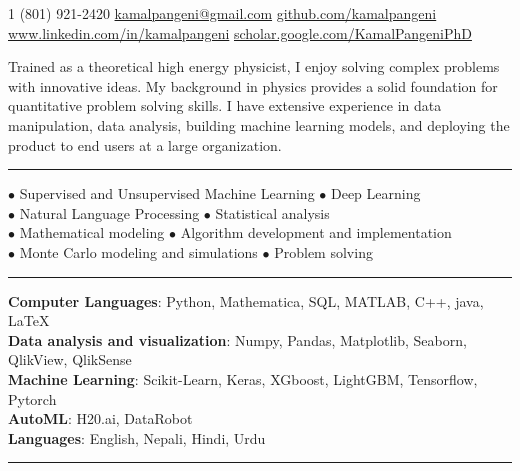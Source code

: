 \documentclass[10pt,letterpaper]{article}
\begin{document}

\noindent\textsmaller{+}1 (801) 921-2420\bull
\href{mailto:kamalpangeni@gmail.com}{kamalpangeni@gmail.com}\bull
\href{https://github.com/kamalpangeni}
{github.com/kamalpangeni}\\
\href{https://www.linkedin.com/in/kamal-pangeni-31242a29/}
{www.linkedin.com/in/kamalpangeni}\bull
\href{https://scholar.google.com/citations?user=MJPS73gAAAAJ&hl=en}
{scholar.google.com/\textsmaller{+}KamalPangeniPhD}

\spacedhrule{0.9em}{-0.4em}

Trained as a theoretical high energy physicist, I enjoy solving complex problems with innovative ideas. My background in physics provides a solid foundation for quantitative problem solving skills. I have extensive experience in data manipulation, data analysis, building machine learning models, and deploying the product to end users at a large organization.\\
\hrule
 $\bullet$ Supervised and Unsupervised Machine Learning \hspace{2.6cm}
 $\bullet$ Deep Learning\\
 $\bullet$ Natural Language Processing\hspace{5.4cm}
 $\bullet$ Statistical analysis\\
 $\bullet$ Mathematical modeling \hspace{6.1cm}
 $\bullet$ Algorithm development and implementation\\
 $\bullet$ Monte Carlo modeling and simulations \hspace{3.95cm}
 $\bullet$ Problem solving
 
\hrule
{}
\textbf{Computer Languages}: Python, Mathematica, SQL, MATLAB, C++, java, \LaTeX \\
\textbf{Data analysis and visualization}: Numpy, Pandas, Matplotlib, Seaborn, QlikView, QlikSense\\
\textbf{ Machine Learning}: Scikit-Learn, Keras, XGboost, LightGBM, Tensorflow, Pytorch\\
\textbf{ AutoML}: H20.ai, DataRobot\\
\textbf{Languages}: English, Nepali, Hindi, Urdu\\
\hrule
\end{document}
